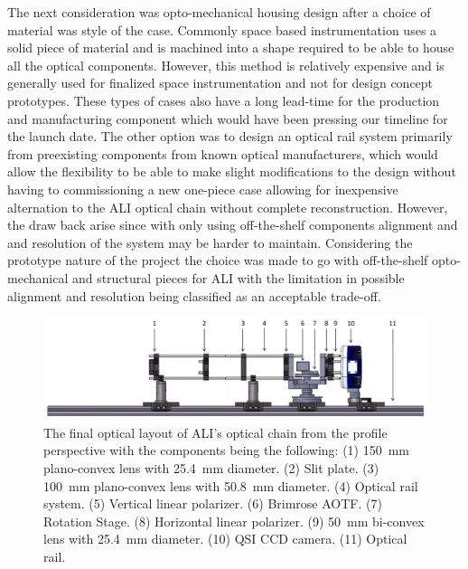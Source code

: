 The next consideration was opto-mechanical housing design after a choice of material was style of the case. Commonly space based instrumentation uses a solid piece of material and is machined into a shape required to be able to house all the optical components. However, this method is relatively expensive and is generally used for finalized space instrumentation and not for design concept prototypes. These types of cases also have a long lead-time for the production and manufacturing component which would have been pressing our timeline for the launch date. The other option was to design an optical rail system primarily from preexisting components from known optical manufacturers, which would allow the flexibility to be able to make slight modifications to the design without having to commissioning a new one-piece case allowing for inexpensive alternation to the ALI optical chain without complete reconstruction. However, the draw back arise since with only using off-the-shelf components alignment and and resolution of the system may be harder to maintain. Considering the prototype nature of the project the choice was made to go with off-the-shelf opto-mechanical and structural pieces for ALI with the limitation in possible alignment and resolution being classified as an acceptable trade-off.

\begin{figure}[h!]
    \begin{center}
    \includegraphics[width=1.0\textwidth]{./Images/3-3-OptoMechanicalSolidWorksLayoutProfile.pdf}
    \caption[ALI's Opto-mechanical Layout]{The final optical layout of ALI's optical chain from the profile perspective with the components being the following: (1) 150~mm plano-convex lens with 25.4~mm diameter. (2) Slit plate. (3) 100~mm plano-convex lens with 50.8~mm diameter. (4) Optical rail system. (5) Vertical linear polarizer. (6) Brimrose AOTF. (7) Rotation Stage. (8) Horizontal linear polarizer. (9) 50~mm bi-convex lens with 25.4~mm diameter. (10) QSI CCD camera. (11) Optical rail.}
   \label{fig:3.3:optoMechanicDesign}
    \end{center}
\end{figure}

